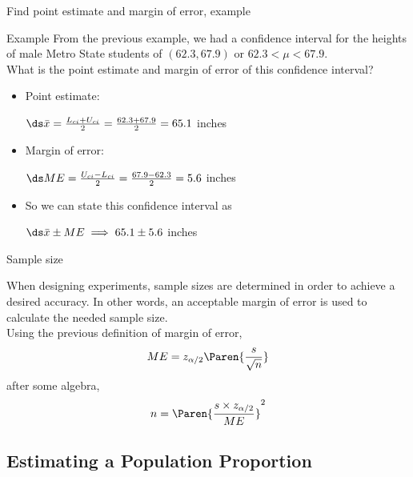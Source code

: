 \documentclass[xcolor=table, handout]{beamer}
\begin{document}
\begin{frame}{Find point estimate and margin of error, example}
\begin{exampleblock}{Example}
From the previous example, we had a confidence interval for the heights of male Metro State students of $(62.3, 67.9)$ or $62.3 < \mu < 67.9$.\\
\medskip
 What is the point estimate and margin of error of this confidence interval?\\
\medskip
\begin{itemize}
\pause\item Point estimate:\\
\smallskip
{\centering
$\ds \bar x = \frac {L_{ci} + U_{ci}}{2} = \frac {62.3 + 67.9}{2} = 65.1$ inches
\par}
\smallskip
\pause\item Margin of error:\\
\smallskip
{\centering
$\ds ME = \frac {U_{ci} - L_{ci}}{2} = \frac {67.9 - 62.3}{2} = 5.6$ inches
\par}
\smallskip
\pause\item So we can state this confidence interval as\\
\smallskip
{\centering
$\ds \bar x \pm ME \implies 65.1 \pm 5.6$ inches
\par}

\end{itemize}
\medskip
\end{exampleblock}

\end{frame}

\begin{frame}{Sample size}
\begin{block}{}
\large
When designing experiments, sample sizes are determined in order to achieve a desired accuracy. In other words, an acceptable margin of error is used to calculate the needed sample size.\\
\pause\medskip
Using the previous definition of margin of error,
\[ME = z_{\alpha/2} \Paren{\frac s {\sqrt n}}\]
after some algebra,
\[ n = \Paren{\frac {s \times z_{\alpha/2}}{ME}}^2\]
\end{block}
\end{frame}

\subsection{Estimating a Population Proportion}
\end{document}
